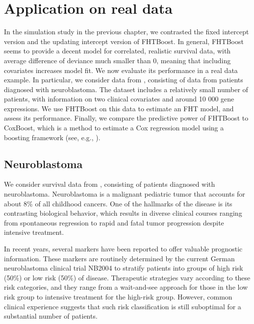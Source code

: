 \chapter{Application on real data}
In the simulation study in the previous chapter, we contrasted the fixed intercept version and the updating intercept version of FHTBoost.
In general, FHTBoost seems to provide a decent model for correlated, realistic survival data, with average difference of deviance much smaller than 0, meaning that including covariates increases model fit.
We now evaluate its performance in a real data example.
In particular, we consider data from \citet{oberthuer-data}, consisting of data from patients diagnosed with neuroblastoma.
The dataset includes a relatively small number of patients, with information on two clinical covariates and around 10 000 gene expressions.
We use FHTBoost on this data to estimate an FHT model, and assess its performance.
Finally, we compare the predictive power of FHTBoost to CoxBoost, which is a method to estimate a Cox regression model using a boosting framework (see, e.g., \citet{BinderSchumacher2008}).

\section{Neuroblastoma}
We consider survival data from \citet{oberthuer-data}, consisting of patients diagnosed with neuroblastoma.
Neuroblastoma is a malignant pediatric tumor that accounts for about 8\% of all childhood cancers.
One of the hallmarks of the disease is its contrasting biological behavior, which results in diverse clinical courses ranging from spontaneous regression to rapid and fatal tumor progression despite intensive treatment.

In recent years, several markers have been reported to offer valuable prognostic information.
These markers are routinely determined by the current German neuroblastoma clinical trial NB2004 to stratify patients into groups of high risk (50\%) or low risk (50\%) of disease.
Therapeutic strategies vary according to these risk categories, and they range from a wait-and-see approach for those in the low risk group
to intensive treatment for the high-risk group.
However, common clinical experience suggests that such risk classification is still suboptimal for a substantial number of patients.

